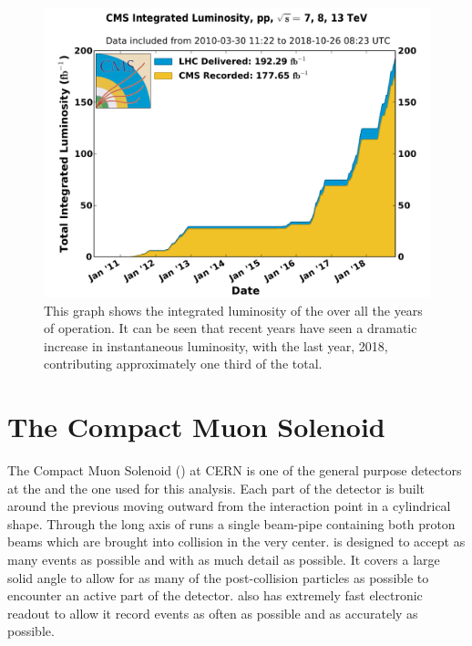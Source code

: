 \begin{figure}[!tp]
    \centering
    \includegraphics[width=\textwidth]{figures/int_lumi_allcumulative_pp.pdf}
    \caption[
        Multi-year delivered luminosity of the \LHC
    ]    
    {
        This graph shows the integrated luminosity of the \LHC over all the years of operation.  It can be seen that recent years have seen a dramatic increase in instantaneous luminosity, with the last year, 2018, contributing approximately one third of the total.
    }
    \label{fig:lhc_delv_lumi}

\end{figure}

\section{The Compact Muon Solenoid}
The Compact Muon Solenoid (\CMS) at CERN is one of the general purpose detectors at the \LHC and the one used for this analysis.  Each part of the detector is built around the previous moving outward from the interaction point in a cylindrical shape.  Through the long axis of \CMS runs a single beam-pipe containing both proton beams which are brought into collision in the very center. \CMS is designed to accept as many events as possible and with as much detail as possible.  It covers a large solid angle to allow for as many of the post-collision particles as possible to encounter an active part of the detector.  \CMS also has extremely fast electronic readout to allow it record events as often as possible and as accurately as possible.

